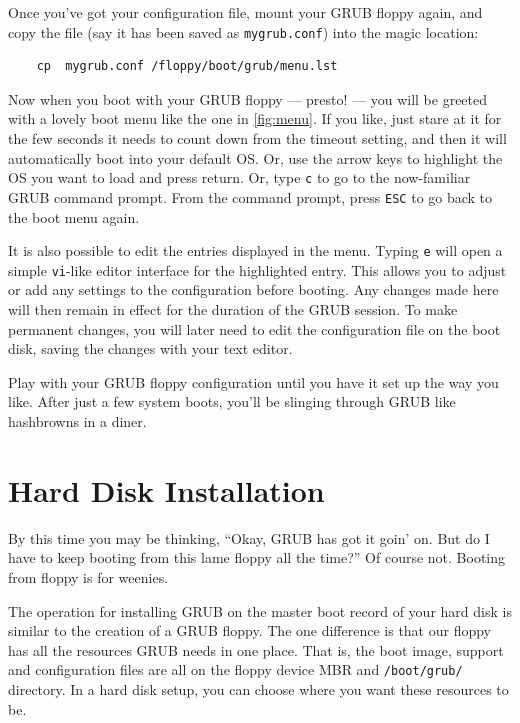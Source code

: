 \documentclass{article}
\begin{document}
Once you've got your configuration file, mount your GRUB floppy again, and copy the file (say it has been saved as \texttt{mygrub.conf}) into the magic location:

\begin{verbatim}
    cp  mygrub.conf /floppy/boot/grub/menu.lst
\end{verbatim}

Now when you boot with your GRUB floppy — presto! — you will be greeted with a lovely boot menu like the one in \ref{fig:menu}. If you like, just stare at it for the few seconds it needs to count down from the timeout setting, and then it will automatically boot into your default OS. Or, use the arrow keys to highlight the OS you want to load and press return.
Or, type \texttt{c} to go to the now-familiar GRUB command prompt.
From the command prompt, press \texttt{ESC} to go back to the boot menu again.

It is also possible to edit the entries displayed in the menu.
Typing \texttt{e} will open a simple \texttt{vi}-like editor interface for the highlighted entry.
This allows you to adjust or add any settings to the configuration before booting.
Any changes made here will then remain in effect for the duration of the GRUB session.
To make permanent changes, you will later need to edit the configuration file on the boot disk,
saving the changes with your text editor.

Play with your GRUB floppy configuration until you have it set up the way you like.
After just a few system boots, you'll be slinging through GRUB like hashbrowns in a diner.








\section{Hard Disk Installation}

By this time you may be thinking, “Okay, GRUB has got it goin' on. But do I have to keep booting from this lame floppy all the time?” Of course not. Booting from floppy is for weenies.

The operation for installing GRUB on the master boot record of your hard disk is similar to the creation of a GRUB floppy. The one difference is that our floppy has all the resources GRUB needs in one place. That is, the boot image, support and configuration files are all on the floppy device MBR and \texttt{/boot/grub/} directory. In a hard disk setup, you can choose where you want these resources to be.
\end{document}
